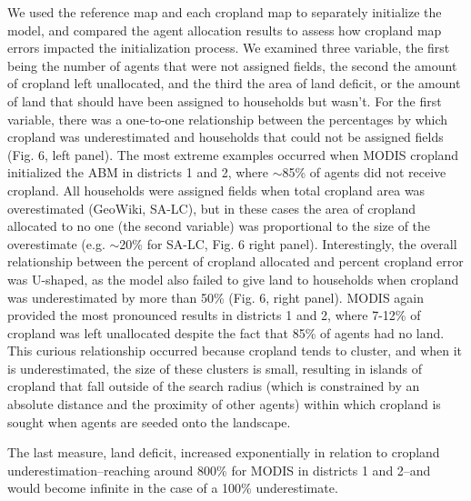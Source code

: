 \documentclass{pnastwo}
\begin{document}
\begin{article}
We used the reference map and each cropland map to separately initialize the model, and compared the agent allocation results to assess how cropland map errors impacted the initialization process. We examined three variable, the first being the number of agents that were not assigned fields, the second the amount of cropland left unallocated, and the third the area of land deficit, or the amount of land that should have been assigned to households but wasn't. For the first variable, there was a one-to-one relationship between the percentages by which cropland was underestimated and households that could not be assigned fields (Fig. 6, left panel). The most extreme examples occurred when MODIS cropland initialized the ABM in districts 1 and 2, where $\sim$85\% of agents did not receive cropland. All households were assigned fields when total cropland area was overestimated (GeoWiki, SA-LC), but in these cases the area of cropland allocated to no one (the second variable) was proportional to the size of the overestimate (e.g. $\sim$20\% for SA-LC, Fig. 6 right panel). Interestingly, the overall relationship between the percent of cropland allocated and percent cropland error was U-shaped, as the model also failed to give land to households when cropland was underestimated by more than 50\% (Fig. 6, right panel). MODIS again provided the most pronounced results in districts 1 and 2, where 7-12\% of cropland was left unallocated despite the fact that 85\% of agents had no land. This curious relationship occurred because cropland tends to cluster, and when it is underestimated, the size of these clusters is small, resulting in islands of cropland that fall outside of the search radius (which is constrained by an absolute distance and the proximity of other agents) within which cropland is sought when agents are seeded onto the landscape. 

The last measure, land deficit, increased exponentially in relation to cropland underestimation--reaching around 800\% for MODIS in districts 1 and 2--and would become infinite in the case of a 100\% underestimate.



\end{article}
\end{document}
